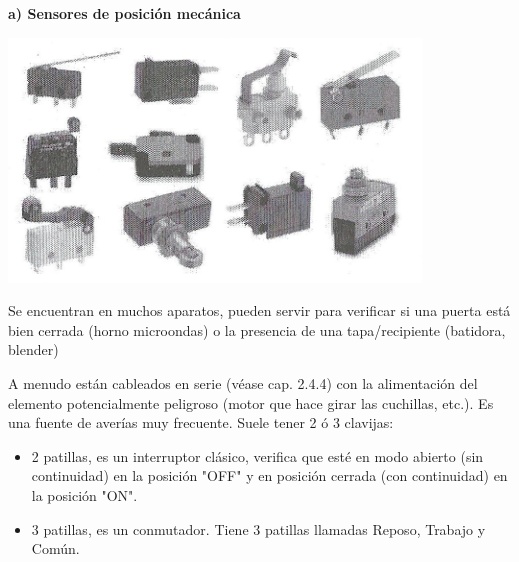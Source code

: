 \documentclass[a5paper,twoside,openany]{book}
\begin{document}
\begin{center}
\textbf{a) Sensores de posición mecánica}
\end{center}
\begin{minipage}[h]{\textwidth}\vspace{0pt}
\includegraphics[width=0.6\linewidth]{sensores-posicion-mecanica}
\centering
\end{minipage}

Se encuentran en muchos aparatos, pueden servir para verificar si una puerta está bien cerrada (horno microondas) o la presencia de una tapa/recipiente (batidora, blender)
\newpage

A menudo están cableados en serie (véase cap. 2.4.4) con la alimentación del elemento potencialmente peligroso (motor que hace girar las cuchillas, etc.).
Es una fuente de averías muy frecuente. Suele tener 2 ó 3 clavijas:

\begin{itemize}
\item 2 patillas, es un interruptor clásico, verifica que esté en modo abierto (sin continuidad) en la posición "OFF" y en posición cerrada (con continuidad) en la posición "ON".
\item 3 patillas, es un conmutador. Tiene 3 patillas llamadas Reposo, Trabajo y Común.
\end{itemize}
\end{document}
